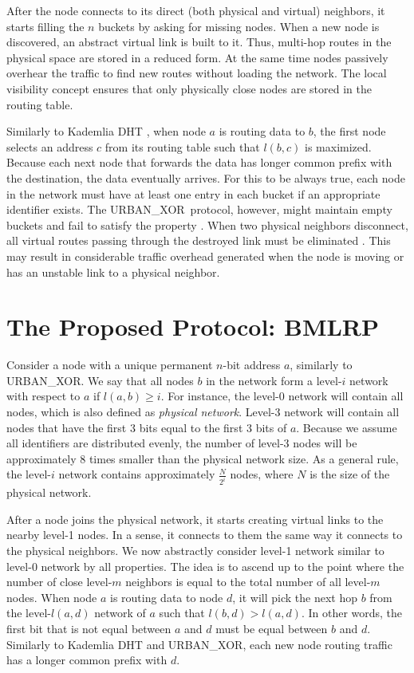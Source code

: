 \documentclass[conference]{IEEEtran}
\theoremstyle{definition}
\newcommand{\urbanxor}{URBAN\_XOR}
\begin{document}
After the node connects to its direct (both physical and virtual) neighbors, it starts filling the $n$ buckets by asking for missing nodes. When a new node is discovered, an abstract virtual link is built to it. Thus, multi-hop routes in the physical space are stored in a reduced form. At the same time nodes passively overhear the traffic to find new routes without loading the network. The local visibility concept ensures that only physically close nodes are stored in the routing table.

Similarly to Kademlia DHT \cite{kademlia}, when node $a$ is routing data to $b$, the first node selects an address $c$ from its routing table such that $l(b,c)$ is maximized. Because each next node that forwards the data has longer common prefix with the destination, the data eventually arrives. For this to be always true, each node in the network must have at least one entry in each bucket if an appropriate identifier exists. The \urbanxor\ protocol, however, might maintain empty buckets and fail to satisfy the property \cite{Pasquini}. When two physical neighbors disconnect, all virtual routes passing through the destroyed link must be eliminated \cite{Pasquini}. This may result in considerable traffic overhead generated when the node is moving or has an unstable link to a physical neighbor.


\section{The Proposed Protocol:  BMLRP}
\label{sec:bmlrp}

Consider a node with a unique permanent $n$-bit address $a$, similarly to \urbanxor. We say that all nodes $b$ in the network form a level-$i$ network with respect to $a$ if $l(a,b) \ge i$. For instance, the level-0 network will contain all nodes, which is also defined as \emph{physical network}. Level-3 network will contain all nodes that have the first 3 bits equal to the first 3 bits of $a$. Because we assume all identifiers are distributed evenly, the number of level-3 nodes will be approximately 8 times smaller than the physical network size. As a general rule, the level-$i$ network contains approximately $\frac{N}{2^i}$ nodes, where $N$ is the size of the physical network.

After a node joins the physical network, it starts creating virtual links to the nearby level-1 nodes. In a sense, it connects to them the same way it connects to the physical neighbors. We now abstractly consider level-1 network similar to level-0 network by all properties. The idea is to ascend up to the point where the number of close level-$m$ neighbors is equal to the total number of all level-$m$ nodes. When node $a$ is routing data to node $d$, it will pick the next hop $b$ from the level-$l(a,d)$ network of $a$ such that $l(b,d) > l(a,d)$. In other words, the first bit that is not equal between $a$ and $d$ must be equal between $b$ and $d$. Similarly to Kademlia DHT and \urbanxor, each new node routing traffic has a longer common prefix with $d$.
\end{document}
